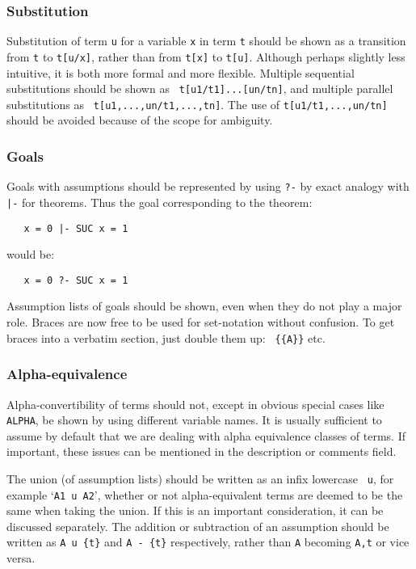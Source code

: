 \documentclass[12pt]{article}
\begin{document}
\subsubsection{Substitution}

Substitution of term {\tt u} for a variable {\tt x} in term {\tt t} should be
shown as a transition from {\tt t} to {\tt t[u/x]}, rather than from {\tt t[x]}
to {\tt t[u]}. Although perhaps slightly less intuitive, it is both more formal
and more flexible. Multiple sequential substitutions should be shown as {\tt
t[u1/t1]...[un/tn]}, and multiple parallel substitutions as {\tt
t[u1,...,un/t1,...,tn]}. The use of {\tt t[u1/t1,...,un/tn]} should be avoided
because of the scope for ambiguity.

\subsubsection{Goals}

Goals with assumptions should be represented by using {\tt ?-} by exact analogy
with {\tt |-} for theorems. Thus the goal corresponding to the theorem:

\begin{verbatim}
   x = 0 |- SUC x = 1
\end{verbatim}

\noindent would be:

\begin{verbatim}
   x = 0 ?- SUC x = 1
\end{verbatim}

\noindent Assumption lists of goals should be shown, even when they do not play
a major role. Braces are now free to be used for set-notation without
confusion. To get braces into a verbatim section, just double them up: {\tt
\{\{A\}\}} etc.

\subsubsection{Alpha-equivalence}

Alpha-convertibility of terms should not, except in obvious special cases like
{\tt ALPHA}, be shown by using different variable names. It is usually
sufficient to assume by default that we are dealing with alpha equivalence
classes of terms. If important, these issues can be mentioned in the
description or comments field.

The union (of assumption lists) should be written as an infix lowercase {\tt
u}, for example `{\tt A1 u A2}', whether or not alpha-equivalent terms are
deemed to be the same when taking the union.  If this is an important
consideration, it can be discussed separately.  The addition or subtraction of
an assumption should be written as {\tt A u \{t\}} and {\tt A - \{t\}}
respectively, rather than {\tt A} becoming {\tt A,t} or vice versa.
\end{document}
